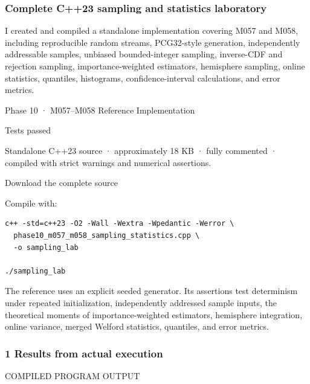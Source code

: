 \subsubsection{Complete C++23 sampling and statistics laboratory}\label{02-foundations-ii-ch039-complete-c23-sampling-and-statistics-laboratory}

I created and compiled a standalone implementation covering M057 and M058, including reproducible random streams, PCG32-style generation, independently addressable samples, unbiased bounded-integer sampling, inverse-CDF and rejection sampling, importance-weighted estimators, hemisphere sampling, online statistics, quantiles, histograms, confidence-interval calculations, and error metrics.

Phase 10 · M057--M058 Reference Implementation

Tests passed

Standalone C++23 source · approximately 18 KB · fully commented · compiled with strict warnings and numerical assertions.

Download the complete source

Compile with:

\begin{verbatim}
c++ -std=c++23 -O2 -Wall -Wextra -Wpedantic -Werror \
  phase10_m057_m058_sampling_statistics.cpp \
  -o sampling_lab

./sampling_lab
\end{verbatim}

The reference uses an explicit seeded generator. Its assertions test determinism under repeated initialization, independently addressed sample inputs, the theoretical moments of importance-weighted estimators, hemisphere integration, online variance, merged Welford statistics, quantiles, and error metrics.

\subsubsection{1 Results from actual execution}\label{02-foundations-ii-ch039-results-from-actual-execution}

COMPILED PROGRAM OUTPUT

